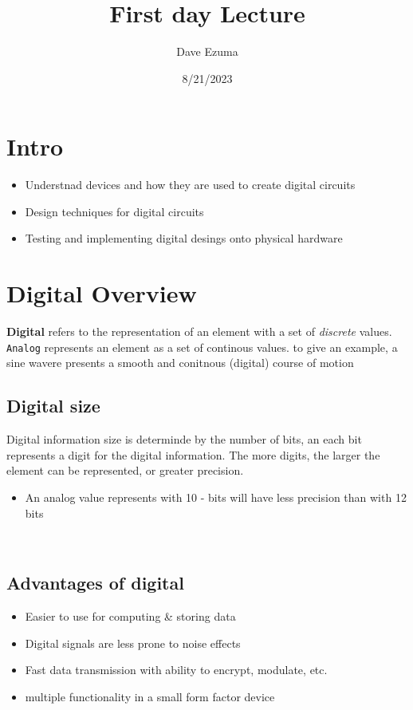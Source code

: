 \documentclass[a4paper, 12pt]{article}
\title{First day Lecture}
\date{8/21/2023}
\author{Dave Ezuma}
\begin{document}
    \maketitle
    \section*{Intro}
    \begin{itemize}
        \item Understnad devices and how they are used to create digital circuits
        \item Design techniques for digital circuits
        \item Testing and implementing digital desings onto physical hardware
    \end{itemize}
    \section{Digital Overview}
    \textbf{Digital} refers to the representation of an element with a set of \textit{discrete} values. \\
    \texttt{Analog} represents an element as a set of continous values. to give an example, a sine wavere
    presents a smooth and conitnous (digital) course of motion

    \subsection*{Digital size}
    Digital information size is determinde by the number of bits, an each bit represents a digit for the digital information.
    The more digits, the larger the element can be represented, or greater precision.
    \begin{itemize}
        \item An analog value represents with 10 - bits will have less precision than with 12 bits
    \end{itemize}
    \
    \subsection*{Advantages of digital}
    \begin{itemize}
        \item Easier to use for computing \& storing data
        \item Digital signals are less prone to noise effects
        \item Fast data transmission with ability to encrypt, modulate, etc.
        \item multiple functionality in a small form factor device
    \end{itemize}
\end{document}
